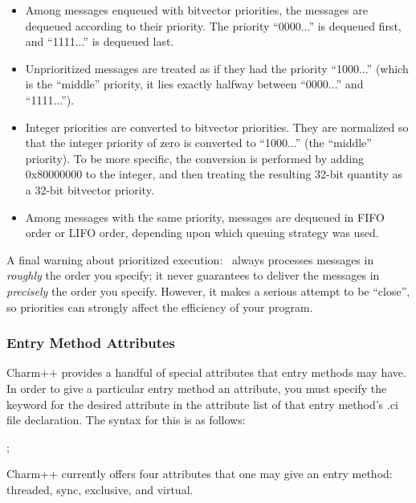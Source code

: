 \begin{itemize}

\item Among messages enqueued with bitvector priorities, the
messages are dequeued according to their priority.  The
priority ``0000...'' is dequeued first, and ``1111...'' is
dequeued last.

\item Unprioritized messages are treated as if they had the
priority ``1000...'' (which is the ``middle'' priority, it
lies exactly halfway between ``0000...'' and ``1111...'').
 
\item Integer priorities are converted to bitvector priorities.  They
are normalized so that the integer priority of zero is converted to
``1000...'' (the ``middle'' priority).  To be more specific, the
conversion is performed by adding 0x80000000 to the integer, and then
treating the resulting 32-bit quantity as a 32-bit bitvector priority.

\item Among messages with the same priority, messages are
dequeued in FIFO order or LIFO order, depending upon which
queuing strategy was used.

\end{itemize} 

A final warning about prioritized execution: \charmpp\ always processes
messages in {\it roughly} the order you specify; it never guarantees to
deliver the messages in {\it precisely} the order you specify.
However, it makes a serious attempt to be ``close'', so priorities
can strongly affect the efficiency of your program.

\subsubsection{Entry Method Attributes}
\label{attributes}

Charm++ provides a handful of special attributes that entry
methods may have.  In order to give a particular entry
method an attribute, you must specify the keyword for the desired attribute in
the attribute list of that entry method's .ci file declaration.  The syntax for
this is as follows:

\small
{} ;
\normalsize

Charm++ currently offers four attributes that one may give an entry method:
threaded, sync, exclusive, and virtual.

